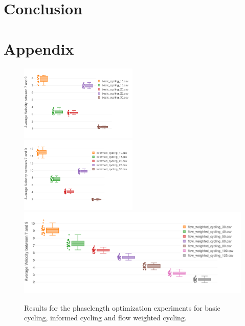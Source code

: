 \documentclass[11pt]{article}
\begin{document}
\section{Conclusion}
\label{sec:conclusion}


{\tiny\printbibliography}


\clearpage

\section*{Appendix}

\begin{figure}[h]
\includegraphics[width=0.5\textwidth]{img/basic-opt.png}
\includegraphics[width=0.5\textwidth]{img/informed-opt.png}
\includegraphics[width=\textwidth]{img/flow-opt.png}
\caption{Results for the phaselength optimization experiments for basic cycling, informed cycling and flow weighted cycling. \label{fig:opt-results}}
\end{figure}
\end{document}
